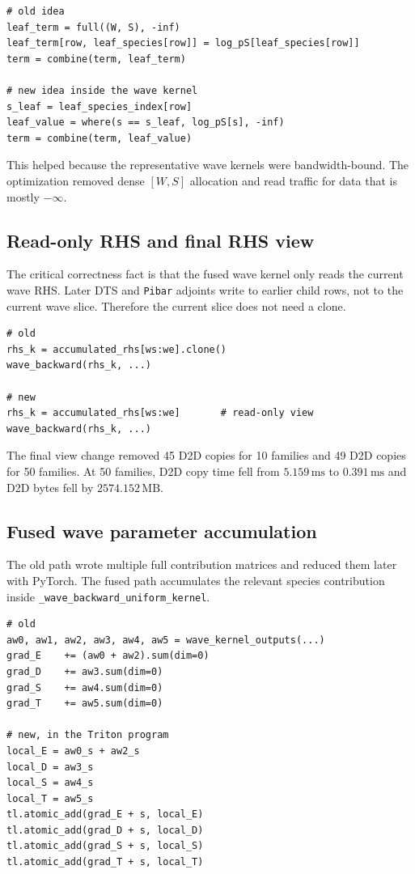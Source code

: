 \documentclass[11pt]{article}
\newcommand{\ms}{\,\mathrm{ms}}
\newcommand{\mb}{\,\mathrm{MB}}
\newcommand{\code}[1]{\texttt{#1}}
\begin{document}
\begin{lstlisting}
# old idea
leaf_term = full((W, S), -inf)
leaf_term[row, leaf_species[row]] = log_pS[leaf_species[row]]
term = combine(term, leaf_term)

# new idea inside the wave kernel
s_leaf = leaf_species_index[row]
leaf_value = where(s == s_leaf, log_pS[s], -inf)
term = combine(term, leaf_value)
\end{lstlisting}

This helped because the representative wave kernels were bandwidth-bound.  The
optimization removed dense $[W,S]$ allocation and read traffic for data that is
mostly \(-\infty\).

\subsection{Read-only RHS and final RHS view}

The critical correctness fact is that the fused wave kernel only reads the
current wave RHS.  Later DTS and \code{Pibar} adjoints write to earlier child
rows, not to the current wave slice.  Therefore the current slice does not need
a clone.

\begin{lstlisting}
# old
rhs_k = accumulated_rhs[ws:we].clone()
wave_backward(rhs_k, ...)

# new
rhs_k = accumulated_rhs[ws:we]       # read-only view
wave_backward(rhs_k, ...)
\end{lstlisting}

The final view change removed 45 D2D copies for 10 families and 49 D2D copies
for 50 families.  At 50 families, D2D copy time fell from $5.159\ms$ to
$0.391\ms$ and D2D bytes fell by $2574.152\mb$.

\subsection{Fused wave parameter accumulation}

The old path wrote multiple full contribution matrices and reduced them later
with PyTorch.  The fused path accumulates the relevant species contribution
inside \code{\_wave\_backward\_uniform\_kernel}.

\begin{lstlisting}
# old
aw0, aw1, aw2, aw3, aw4, aw5 = wave_kernel_outputs(...)
grad_E    += (aw0 + aw2).sum(dim=0)
grad_D    += aw3.sum(dim=0)
grad_S    += aw4.sum(dim=0)
grad_T    += aw5.sum(dim=0)

# new, in the Triton program
local_E = aw0_s + aw2_s
local_D = aw3_s
local_S = aw4_s
local_T = aw5_s
tl.atomic_add(grad_E + s, local_E)
tl.atomic_add(grad_D + s, local_D)
tl.atomic_add(grad_S + s, local_S)
tl.atomic_add(grad_T + s, local_T)
\end{lstlisting}
\end{document}
